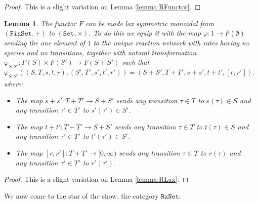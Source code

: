\documentclass{compositionalityarticle}
\newcommand{\FinSet}{\mathtt{FinSet}}
\newcommand{\Set}{\mathtt{Set}}
\newcommand{\RxNet}{\mathtt{RxNet}}
\newcommand{\maps}{\colon}
\theoremstyle{compositionality}
\newtheorem{lem}[thm]{Lemma}
\theoremstyle{remark}
\begin{document}
\begin{proof}
This is a slight variation on Lemma \ref{lemma:RFunctor}.
\end{proof}

\begin{lem}
\label{lemma:RxLax}
The functor $F$ can be made lax symmetric monoidal from $(\FinSet, +)$ to $(\Set, \times)$.  To do this we equip it with the map $\varphi \maps 1 \to F(\emptyset)$ sending the one element of $1$ to the unique reaction network with rates having no species and no transitions, together with natural transformation $\varphi_{S,S'} \maps F(S) \times F(S') \to F(S + S')$ 
such that
\[
    \varphi_{S,S'} ((S,T,s,t,r), (S',T',s',t',r')) = (S + S', T + T', s+s', t+t',[r,r']).  
\]
where:
\begin{itemize}
\item The map $s + s' \maps T + T' \to S + S'$ sends any transition $\tau \in T$ 
to $s(\tau) \in S$ and any transition $\tau' \in T'$ to $s'(\tau') \in S'$.  
\item The map $t + t' \maps T + T' \to S + S'$ sends any transition $\tau \in T$ 
to $t(\tau) \in S$ and any transition $\tau' \in T'$ to $t'(\tau') \in S'$.  
\item The map $[r,r'] \maps T + T' \to [0,\infty)$ sends any transition $\tau \in T$ to $r(\tau)$ and any transition $\tau' \in T'$ to $r'(\tau')$.  
\end{itemize}
\end{lem}

\begin{proof}
This is a slight variation on Lemma \ref{lemma:RLax}. 
\end{proof}

We now come to the star of the show, the category $\RxNet$:
\end{document}

